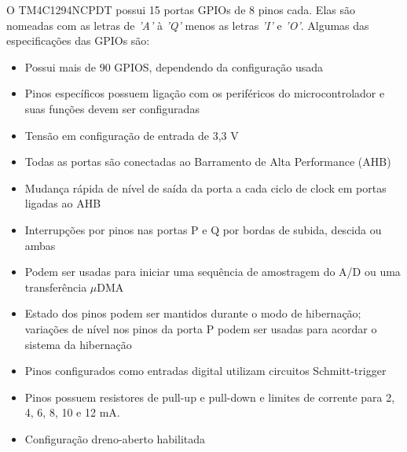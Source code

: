 O TM4C1294NCPDT possui 15 portas GPIOs de 8 pinos cada. Elas são nomeadas com as letras de \emph{'A'} à \emph{'Q'} menos as letras \emph{'I'} e \emph{'O'}. Algumas das especificações das GPIOs são:

\begin{itemize}
	\item Possui mais de 90 GPIOS, dependendo da configuração usada
	\item Pinos específicos possuem ligação com os periféricos do microcontrolador e suas funções devem ser configuradas
	\item Tensão em configuração de entrada de 3,3 V
	\item Todas as portas são conectadas ao Barramento de Alta Performance (AHB)
	\item Mudança rápida de nível de saída da porta a cada ciclo de clock em portas ligadas ao AHB
	\item Interrupções por pinos nas portas P e Q por bordas de subida, descida ou ambas
	\item Podem ser usadas para iniciar uma sequência de amostragem do A/D ou uma transferência $\mu$DMA
	\item Estado dos pinos podem ser mantidos durante o modo de hibernação; variações de nível nos pinos da porta P podem ser usadas para acordar o sistema da hibernação
	\item Pinos configurados como entradas digital utilizam circuitos Schmitt-trigger
	\item Pinos possuem resistores de pull-up e pull-down e limites de corrente para 2, 4, 6, 8, 10 e 12 mA.
	\item Configuração dreno-aberto habilitada
\end{itemize}


